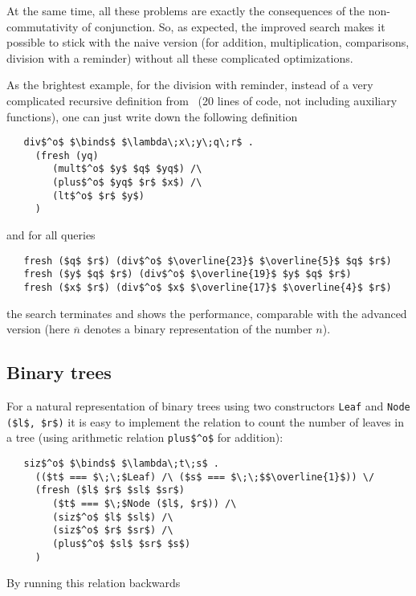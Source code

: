 At the same time, all these problems are exactly the consequences of the non-commutativity 
of conjunction. So, as expected, the improved search makes it possible to stick with
the naive version (for addition, multiplication, comparisons, division with a reminder)
without all these complicated optimizations. 

As the brightest example, for the division with reminder, instead of a very complicated recursive definition 
from~\cite{TRS} (20 lines of code, not including auxiliary functions), one can just write down the 
following definition

\begin{lstlisting}
   div$^o$ $\binds$ $\lambda\;x\;y\;q\;r$ . 
     (fresh (yq)        
        (mult$^o$ $y$ $q$ $yq$) /\
        (plus$^o$ $yq$ $r$ $x$) /\
        (lt$^o$ $r$ $y$)
     )
\end{lstlisting}

\noindent and for all queries

\begin{lstlisting}
   fresh ($q$ $r$) (div$^o$ $\overline{23}$ $\overline{5}$ $q$ $r$)
   fresh ($y$ $q$ $r$) (div$^o$ $\overline{19}$ $y$ $q$ $r$)
   fresh ($x$ $r$) (div$^o$ $x$ $\overline{17}$ $\overline{4}$ $r$)
\end{lstlisting}

\noindent the search terminates and shows the performance, comparable with the advanced version 
(here $\overline{n}$ denotes a binary representation of the number $n$).

\subsection{Binary trees}

For a natural representation of binary trees using two constructors \lstinline|Leaf| and 
\lstinline|Node ($l$, $r$)| it is easy to implement the relation to count the number of 
leaves in a tree (using arithmetic relation \lstinline|plus$^o$| for addition):

\begin{lstlisting}
   siz$^o$ $\binds$ $\lambda\;t\;s$ .
     (($t$ === $\;\;$Leaf) /\ ($s$ === $\;\;$$\overline{1}$)) \/
     (fresh ($l$ $r$ $sl$ $sr$)
        ($t$ === $\;$Node ($l$, $r$)) /\
        (siz$^o$ $l$ $sl$) /\
        (siz$^o$ $r$ $sr$) /\
        (plus$^o$ $sl$ $sr$ $s$)
     )
\end{lstlisting}

By running this relation backwards

